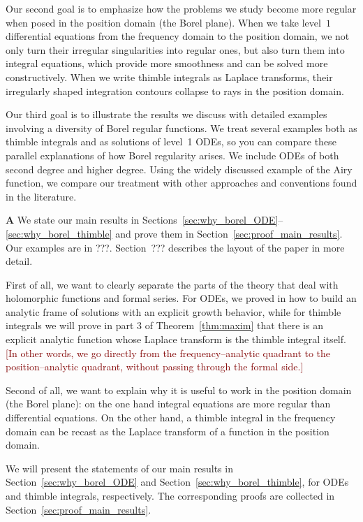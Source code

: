 \documentclass{article}
\theoremstyle{definition}
\theoremstyle{plain}
\newenvironment{todo}{\color{Coral}}{\color{black}}
\newenvironment{old}{\color{RoyalBlue}}{\color{black}}
\newenvironment{draft}{\color{SlateBlue}}{\color{black}}
\begin{document}
Our second goal is to emphasize how the problems we study become more regular when posed in the position domain (the Borel plane). When we take level~$1$ differential equations from the frequency domain to the position domain, we not only turn their irregular singularities into regular ones, but also turn them into integral equations, which provide more smoothness and can be solved more constructively. When we write thimble integrals as Laplace transforms, their irregularly shaped integration contours collapse to rays in the position domain.

Our third goal is to illustrate the results we discuss with detailed examples involving a diversity of Borel regular functions. We treat several examples both as thimble integrals and as solutions of level~1 ODEs, so you can compare these parallel explanations of how Borel regularity arises. We include ODEs of both second degree and higher degree. Using the widely discussed example of the Airy function, we compare our treatment with other approaches and conventions found in the literature.

\begin{draft}\begin{todo}\textbf{A}\end{todo} We state our main results in Sections~\ref{sec:why_borel_ODE}--\ref{sec:why_borel_thimble} and prove them in Section~\ref{sec:proof_main_results}. Our examples are in \begin{todo}???\end{todo}. Section~\begin{todo}???\end{todo} describes the layout of the paper in more detail.
\end{draft}
\begin{old}\par
First of all, we want to clearly separate the parts of the theory that deal with holomorphic functions and formal series. For ODEs, we proved in \cite[Theorem~4]{reg-sing-volterra} how to build an analytic frame of solutions with an explicit growth behavior, while for thimble integrals we will prove in part 3 of Theorem~\ref{thm:maxim} that there is an explicit analytic function whose Laplace transform is the thimble integral itself. \textcolor{Maroon}{[In other words, we go directly from the frequency--analytic quadrant to the position--analytic quadrant, without passing through the formal side.]}

Second of all, we want to explain why it is useful to work in the position domain (the Borel plane): on the one hand integral equations are more regular than differential equations. On the other hand, a thimble integral in the frequency domain can be recast as the Laplace transform of a function in the position domain.

We will present the statements of our main results in Section~\ref{sec:why_borel_ODE} and Section~\ref{sec:why_borel_thimble}, for ODEs and thimble integrals, respectively. The corresponding proofs are collected in Section~\ref{sec:proof_main_results}.
\end{old}
\end{document}
